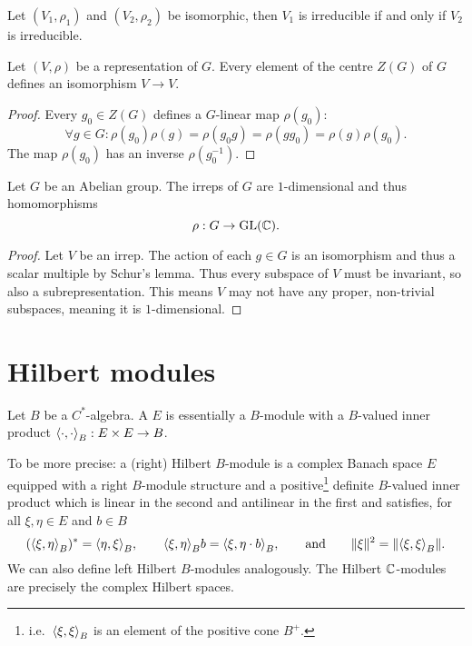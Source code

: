 \begin{proposition}
Let $(V_1,\rho_1)$ and $(V_2,\rho_2)$ be isomorphic, then $V_1$ is irreducible \textup{if and only if} $V_2$ is irreducible.
\end{proposition}

\begin{proposition}
Let $(V,\rho)$ be a representation of $G$. Every element of the centre $Z(G)$ of $G$ defines an isomorphism $V\to V$.
\end{proposition}
\begin{proof}
Every $g_0\in Z(G)$ defines a $G$-linear map $\rho(g_0)$:
\[ \forall g\in G: \rho(g_0)\rho(g) = \rho(g_0g) = \rho(gg_0) = \rho(g) \rho(g_0). \]
The map $\rho(g_0)$ has an inverse $\rho(g_0^{-1})$.
\end{proof}

\begin{proposition}
Let $G$ be an Abelian group. The irreps of $G$ are $1$-dimensional and thus homomorphisms
\[ \rho: G\to \operatorname{GL}(\mathbb{C}). \]
\end{proposition}
\begin{proof}
Let $V$ be an irrep. The action of each $g\in G$ is an isomorphism and thus a scalar multiple by Schur's lemma. Thus every subspace of $V$ must be invariant, so also a subrepresentation. This means $V$ may not have any proper, non-trivial subspaces, meaning it is $1$-dimensional.
\end{proof}

\section{Hilbert modules}
Let $B$ be a $C^*$-algebra. A  $E$ is essentially a $B$-module with a $B$-valued inner product $\inner{\cdot, \cdot}_B: E\times E \to B$.

To be more precise: a (right) Hilbert $B$-module is a complex Banach space $E$ equipped with a right $B$-module structure and a positive\footnote{i.e.\ $\inner{\xi, \xi}_B$ is an element of the positive cone $B^+$.} definite $B$-valued inner product which is linear in the second and antilinear in the first and satisfies, for all $\xi,\eta \in E$ and $b\in B$
\[ (\inner{\xi,\eta}_B)^* = \inner{\eta,\xi}_B, \qquad \inner{\xi, \eta}_B b = \inner{\xi,\eta\cdot b}_B, \qquad \text{and} \qquad \norm{\xi}^2 = \norm{\inner{\xi,\xi}_B}. \]
We can also define left Hilbert $B$-modules analogously. The Hilbert $\mathbb{C}$-modules are precisely the complex Hilbert spaces.

